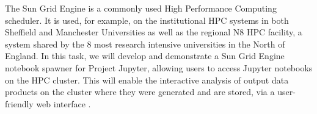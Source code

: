 \begin{workpackage}
\begin{tasklist}
\begin{task}[title=Sun Grid Engine Integration in Project Jupyter Hub, lead=USH,id=hpc-jupyter,wphases=0-12,PM=12]
The Sun Grid Engine is a commonly used High Performance Computing scheduler. It is used, for example, on the institutional HPC systems in both Sheffield and Manchester Universities as well as the regional N8 HPC facility, a system shared by the 8 most research intensive universities in the North of England. In this task, we will develop and demonstrate a Sun Grid Engine notebook spawner for Project Jupyter, allowing users to access Jupyter notebooks on the HPC cluster. This will enable the interactive analysis of output data products on the cluster where they were generated and are stored, via a user-friendly web interface .
\end{task}
\end{tasklist}


\end{workpackage}
